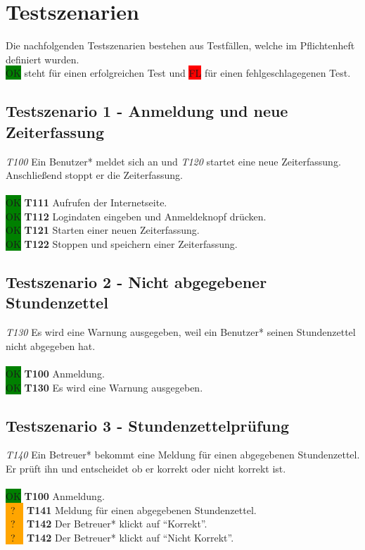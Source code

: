 \section{Testszenarien}
Die nachfolgenden Testszenarien bestehen aus Testfällen, welche im Pflichtenheft \linebreak definiert wurden. \\
\colorbox{green}{OK} steht für einen erfolgreichen Test und \colorbox{red}{FL} für einen fehlgeschlagegenen Test.


\subsection{Testszenario 1 - Anmeldung und neue Zeiterfassung}
\emph{T100} Ein Benutzer* meldet sich an und \emph{T120} startet eine neue Zeiterfassung. Anschließend stoppt er die Zeiterfassung.
\\\\
\colorbox{green}{OK} \textbf{T111} Aufrufen der Internetseite. \\
\colorbox{green}{OK} \textbf{T112} Logindaten eingeben und Anmeldeknopf drücken. \\
\colorbox{green}{OK} \textbf{T121} Starten einer neuen Zeiterfassung. \\
\colorbox{green}{OK} \textbf{T122} Stoppen und speichern einer Zeiterfassung.

\subsection{Testszenario 2 - Nicht abgegebener Stundenzettel}
\emph{T130} Es wird eine Warnung ausgegeben, weil ein Benutzer* seinen Stundenzettel nicht abgegeben hat.
\\\\
\colorbox{green}{OK} \textbf{T100} Anmeldung. \\
\colorbox{green}{OK} \textbf{T130} Es wird eine Warnung ausgegeben.

\subsection{Testszenario 3 - Stundenzettelprüfung}
\emph{T140} Ein Betreuer* bekommt eine Meldung für einen abgegebenen Stundenzettel. Er prüft ihn und entscheidet ob er korrekt oder nicht korrekt ist.
\\\\
\colorbox{green}{OK} \textbf{T100} Anmeldung. \\
\colorbox{orange}{  \ ? \  } \textbf{T141} Meldung für einen abgegebenen Stundenzettel. \\
\colorbox{orange}{  \ ? \  } \textbf{T142} Der Betreuer* klickt auf "`Korrekt"'. \\
\colorbox{orange}{  \ ? \  } \textbf{T142} Der Betreuer* klickt auf "`Nicht Korrekt"'.

